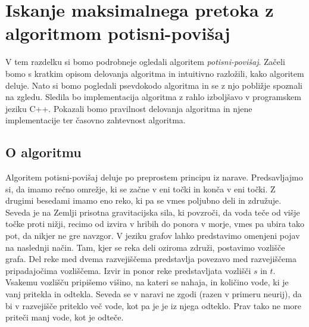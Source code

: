 \documentclass[mat1]{fmfdelo}
\begin{document}
\section{Iskanje maksimalnega pretoka z algoritmom potisni-povišaj}

V tem razdelku si bomo podrobneje ogledali algoritem \textit{potisni-povišaj}. Začeli bomo s kratkim opisom delovanja algoritma in intuitivno razložili, kako algoritem deluje. Nato si bomo pogledali psevdokodo algoritma in se z njo pobližje spoznali na zgledu. Sledila bo implementacija algoritma z rahlo izboljšavo v programskem jeziku C++. Pokazali bomo pravilnost delovanja algoritma in njene implementacije ter časovno zahtevnost algoritma.

\subsection{O algoritmu}
Algoritem potisni-povišaj deluje po preprostem principu iz narave. Predsavljajmo si, da imamo rečno omrežje, ki se začne v eni točki in konča v eni točki. Z drugimi besedami imamo eno reko, ki pa se vmes poljubno deli in združuje. Seveda je na Zemlji prisotna gravitacijska sila, ki povzroči, da voda teče od višje točke proti nižji, recimo od izvira v hribih do ponora v morje, vmes pa ubira tako pot, da nikjer ne gre navzgor. V jeziku grafov lahko predstavimo omenjeni pojav na naslednji način. Tam, kjer se reka deli oziroma združi, postavimo vozlišče grafa. Del reke med dvema razvejiščema predstavlja povezavo med razvejiščema pripadajočima vozliščema. Izvir in ponor reke predstavljata vozlišči $s$ in $t$. Vsakemu vozlišču pripišemo višino, na kateri se nahaja, in količino vode, ki je vanj pritekla in odtekla. Seveda se v naravi ne zgodi (razen v primeru neurij), da bi v razvejišče priteklo več vode, kot pa je je iz njega odteklo. Prav tako ne more priteči manj vode, kot je odteče.
\end{document}
